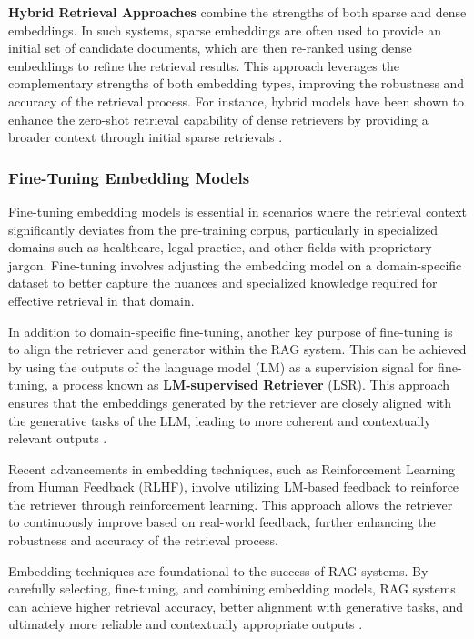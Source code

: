 \textbf{Hybrid Retrieval Approaches} combine the strengths of both sparse and dense embeddings. In such systems, sparse embeddings are often used to provide an initial set of candidate documents, which are then re-ranked using dense embeddings to refine the retrieval results. This approach leverages the complementary strengths of both embedding types, improving the robustness and accuracy of the retrieval process. For instance, hybrid models have been shown to enhance the zero-shot retrieval capability of dense retrievers by providing a broader context through initial sparse retrievals \cite{gao2023retrieval}.

\subsubsection{Fine-Tuning Embedding Models}

Fine-tuning embedding models is essential in scenarios where the retrieval context significantly deviates from the pre-training corpus, particularly in specialized domains such as healthcare, legal practice, and other fields with proprietary jargon. Fine-tuning involves adjusting the embedding model on a domain-specific dataset to better capture the nuances and specialized knowledge required for effective retrieval in that domain.

In addition to domain-specific fine-tuning, another key purpose of fine-tuning is to align the retriever and generator within the RAG system. This can be achieved by using the outputs of the language model (LM) as a supervision signal for fine-tuning, a process known as \textbf{LM-supervised Retriever} (LSR). This approach ensures that the embeddings generated by the retriever are closely aligned with the generative tasks of the LLM, leading to more coherent and contextually relevant outputs \cite{gao2023retrieval}.

Recent advancements in embedding techniques, such as Reinforcement Learning from Human Feedback (RLHF), involve utilizing LM-based feedback to reinforce the retriever through reinforcement learning. This approach allows the retriever to continuously improve based on real-world feedback, further enhancing the robustness and accuracy of the retrieval process.

Embedding techniques are foundational to the success of RAG systems. By carefully selecting, fine-tuning, and combining embedding models, RAG systems can achieve higher retrieval accuracy, better alignment with generative tasks, and ultimately more reliable and contextually appropriate outputs \cite{gao2023retrieval}.

